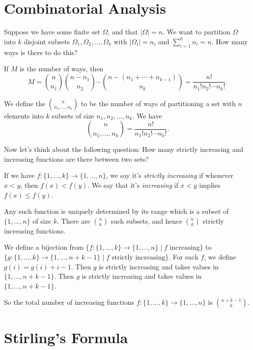 \documentclass[a4paper]{scrreprt}
\begin{document}
\section{Combinatorial Analysis}

Suppose we have some finite set $\Omega$, and that $|\Omega| = n$. We want to partition $\Omega$ into $k$ disjoint subsets $\Omega_1, \Omega_2, \dots, \Omega_k$ with $|\Omega_i| = n_i$ and $\sum_{i = 1}^k n_i = n$. How many ways is there to do this?

If $M$ is the number of ways, then
$$
M = \binom{n}{n_1} \binom{n - n_1}{n_2} \cdots \binom{n - (n_1 + \cdots + n_{k - 1})}{n_k} = \frac{n!}{n_1! n_2 !\cdots n_k !}.
$$

\begin{definition}
	We define the  $\binom{n}{n_1, \dots, n_k}$ to be the number of ways of partitioning a set with $n$ elements into $k$ subsets of size $n_1, n_2, \dots, n_k$. We have
	$$
	\binom{n}{n_1, \dots, n_k} = \frac{n!}{n_1! n_2 !\cdots n_k !}.
	$$
\end{definition}
	
Now let's think about the following question: How many strictly increasing and increasing functions are there between two sets?

If we have $f:\{1, \dots, k\} \rightarrow \{1, \dots, n\}$, we say it's \emph{strictly increasing} if whenever $x < y$, then $f(x) < f(y)$. We say that it's \emph{increasing} if $x < y$ implies $f(x) \leq f(y)$.

Any such function is uniquely determined by its range which is a subset of $\{1, \dots, n\}$ of size $k$. There are $\binom{n}{k}$ such subsets, and hence $\binom{n}{k}$ strictly increasing functions.

We define a bijection from $\{f : \{1, \dots, k \} \rightarrow \{1, \dots, n\} \mid f \text{ increasing}\}$ to $\{g : \{1, \dots, k \} \rightarrow \{1, \dots, n + k - 1\} \mid f \text{ strictly increasing}\}$. For each $f$, we define $g(i) = g(i) + i - 1$. Then $g$ is strictly increasing and takes values in $\{1, \dots, n + k - 1\}$. Then $g$ is strictly increasing and takes values in $\{1, \dots, n + k - 1\}$.

So the total number of increasing functions $f: \{1, \dots, k\} \rightarrow \{1, \dots, n\}$ is $\binom{n + k - 1}{k}$.

\section{Stirling's Formula}
\end{document}
